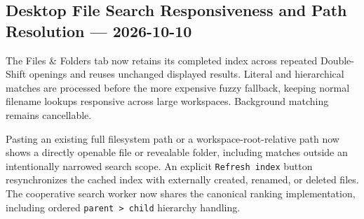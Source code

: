 \documentclass[a4paper]{article}
\title{}
\date{}
\author{Mohammad Rahmani}
\begin{document}
   \maketitle

   \begin{preview}
\section*{Desktop File Search Responsiveness and Path Resolution --- 2026-10-10}
The Files \& Folders tab now retains its completed index across repeated Double-Shift
openings and reuses unchanged displayed results. Literal and hierarchical matches
are processed before the more expensive fuzzy fallback, keeping normal filename
lookups responsive across large workspaces. Background matching remains cancellable.

Pasting an existing full filesystem path or a workspace-root-relative path now
shows a directly openable file or revealable folder, including matches outside
an intentionally narrowed search scope. An explicit \texttt{Refresh index} button
resynchronizes the cached index with externally created, renamed, or deleted files.
The cooperative search worker now shares the canonical ranking implementation,
including ordered \texttt{parent > child} hierarchy handling.

   \end{preview}

   
   
\end{document}
